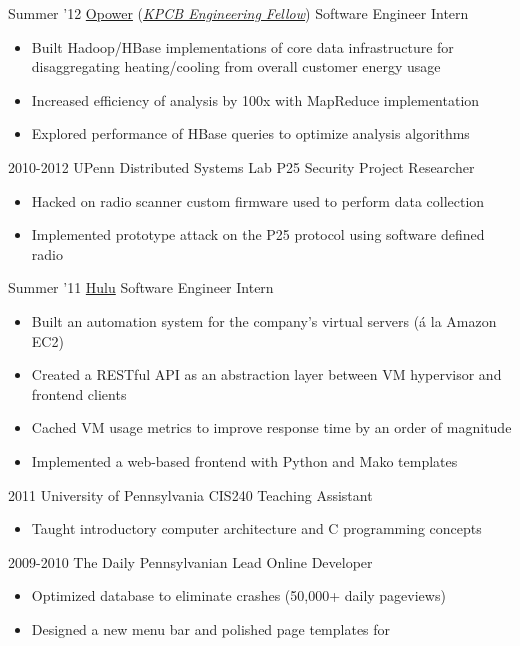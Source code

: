 \documentclass[]{wasserman-cv}
\begin{document}
\begin{entrylist}
  \entry
  {Summer '12}
  {\href{http://opower.com/}{Opower} (\href{http://kpcbfellows.com/}{\emph{KPCB Engineering Fellow}})}
  {Software Engineer Intern}
  {\begin{itemize}
    \item Built Hadoop/HBase implementations of core data
      infrastructure for disaggregating heating/cooling from overall
      customer energy usage
    \item Increased efficiency of analysis by 100x
      with MapReduce implementation
    \item Explored performance of HBase queries to optimize analysis
      algorithms
    \end{itemize}}
  \entry
  {2010-2012}
  {UPenn Distributed Systems Lab}
  {P25 Security Project Researcher}
  {\begin{itemize}
    \item Hacked on radio scanner custom firmware used to perform
      data collection
    \item Implemented prototype attack on the P25 protocol using
      software defined radio
    \end{itemize}}
  \entry
  {Summer '11}
  {\href{http://hulu.com}{Hulu}}
  {Software Engineer Intern}
  {\begin{itemize}
    \item Built an automation system for the company’s virtual servers
      (\'{a} la Amazon EC2)
    \item Created a RESTful API as an abstraction layer between VM
      hypervisor and frontend clients
    \item Cached VM usage metrics to improve response time by an order
      of magnitude
    \item Implemented a web-based frontend with Python and Mako templates
    \end{itemize}}
  \entry
  {2011}
  {University of Pennsylvania}
  {CIS240 Teaching Assistant}
  {\begin{itemize}
    \item Taught introductory computer architecture and C
      programming concepts
    \end{itemize}}
  \entry
  {2009-2010}
  {The Daily Pennsylvanian}
  {Lead Online Developer}
  {\begin{itemize}
    \item Optimized database to eliminate crashes (50,000+ daily
      pageviews)
    \item Designed a new menu bar and polished page templates for

\end{itemize}}
\end{entrylist}
\end{document}
